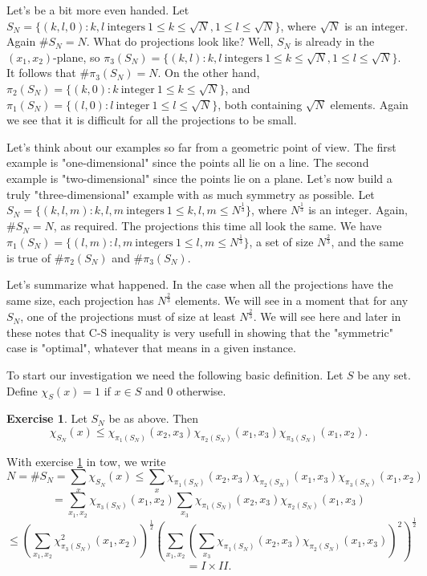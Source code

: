 \documentclass[]{stml-l}
\numberwithin{equation}{chapter}
\theoremstyle{plain}
\theoremstyle{definition}
\newtheorem{exercise}{Exercise}[chapter]
\theoremstyle{remark}
\begin{document}
Let's be a bit more even handed. Let $S_N=\{(k,l,0): k,l \
\text{integers} \ 1 \leq k \leq \sqrt{N}, 1 \leq l \leq \sqrt{N}\}$, where
$\sqrt{N}$ is an integer. Again $\# S_N=N$. What do projections look
like? Well, $S_N$ is already in the $(x_1,x_2)$-plane, so
$\pi_3(S_N)=\{(k,l): k,l \
\text{integers} \ 1 \leq k \leq \sqrt{N}, 1 \leq l \leq \sqrt{N}\}$. It
follows that $\# \pi_3(S_N)=N$. On the other hand, $\pi_2(S_N)=\{(k,0):
k \ \text{integer} \ 1 \leq k \leq \sqrt{N} \}$, and
$\pi_1(S_N)=\{(l,0): l \ \text{integer} \ 1 \leq l \leq \sqrt{N} \}$,
both containing $\sqrt{N}$ elements. Again we see that it is difficult for
all the projections to be small.

Let's think about our examples so far from a geometric point of view. The
first example is "one-dimensional" since the points all lie on a line.
The second example is "two-dimensional" since the points lie on a plane.
Let's now build a truly "three-dimensional" example with as much symmetry
as possible. Let $S_N=\{(k,l,m): k,l,m \ \text{integers} \ 1 \leq k,l,m
\leq N^{\frac{1}{3}}\}$, where $N^{\frac{1}{3}}$ is an integer. Again,
$\# S_N=N$, as required. The projections this time all look the same. We
have $\pi_1(S_N)=\{(l,m): l,m \ \text{integers} \ 1 \leq l,m \leq
N^{\frac{1}{3}}\}$, a set of size $N^{\frac{2}{3}}$, and the same is true
of $\# \pi_2(S_N)$ and $\# \pi_3(S_N)$.

Let's summarize what happened. In the case when all the projections have
the same size, each projection has $N^{\frac{2}{3}}$ elements. We will
see in a moment that for any $S_N$, one of the projections must of size
at least $N^{\frac{2}{3}}$. We will see here and later in these notes
that C-S inequality is very usefull in showing that the "symmetric" case
is "optimal", whatever that means in a given instance.

To start our investigation we need the following basic definition. Let
$S$ be any set. Define $\chi_S(x)=1$ if $x \in S$ and $0$ otherwise.

\begin{exercise} \label{box.ex}
Let $S_N$ be as above. Then
$$\chi_{S_N}(x) \leq
\chi_{\pi_1(S_N)}(x_2,x_3)\chi_{\pi_2(S_N)}(x_1,x_3)
\chi_{\pi_3(S_N)}(x_1,x_2).$$
\end{exercise}

With exercise \ref{box.ex} in tow, we write
$$ N=\# S_N=\sum_{x} \chi_{S_N}(x) \leq
\sum_{x} \chi_{\pi_1(S_N)}(x_2,x_3)\chi_{\pi_2(S_N)}(x_1,x_3)
\chi_{\pi_3(S_N)}(x_1,x_2)$$
$$=\sum_{x_1,x_2} \chi_{\pi_3(S_N)}(x_1,x_2)
\sum_{x_3} \chi_{\pi_1(S_N)}(x_2,x_3)\chi_{\pi_2(S_N)}(x_1,x_3)$$
$$ \leq {\left(\sum_{x_1,x_2}
\chi^2_{\pi_3(S_N)}(x_1,x_2)\right)}^{\frac{1}{2}}
{\left(\sum_{x_1,x_2} {\left(\sum_{x_3}
\chi_{\pi_1(S_N)}(x_2,x_3)\chi_{\pi_2(S_N)}(x_1,x_3)\right)}^2
\right)}^{\frac{1}{2}}$$
$$=I \times II. $$
\end{document}
